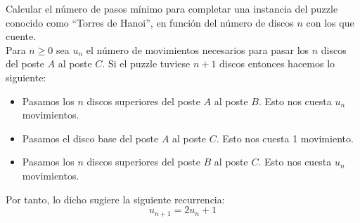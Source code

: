 \begin{ejercicio}
    Calcular el número de pasos mínimo para completar una instancia del puzzle conocido como ``Torres de Hanoi'', en función del número de discos $n$ con los que cuente.\\

    Para $n\geq 0$ sea $u_n$ el número de movimientos necesarios para pasar los $n$ discos
    del poste $A$ al poste $C$. Si el puzzle tuviese $n+1$ discos entonces hacemos lo siguiente:
    \begin{itemize}
        \item Pasamos los $n$ discos superiores del poste $A$ al poste $B$. Esto nos cuesta $u_n$ movimientos.
        \item Pasamos el disco base del poste $A$ al poste $C$. Esto nos cuesta 1 movimiento.
        \item Pasamos los $n$ discos superiores del poste $B$ al poste $C$. Esto nos cuesta $u_n$ movimientos.
    \end{itemize}

    Por tanto, lo dicho sugiere la siguiente recurrencia:
    \begin{equation*}
        u_{n+1} = 2u_n + 1
    \end{equation*}

    

\end{ejercicio}
